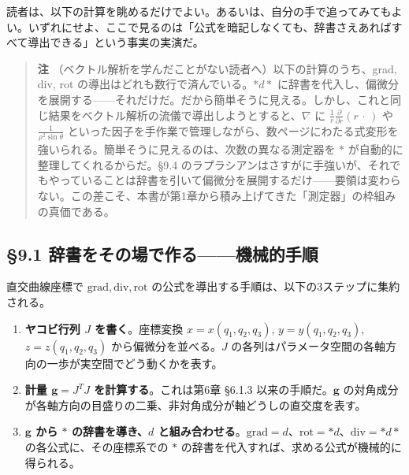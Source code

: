 \documentclass[a4paper,12pt,openany]{book}
\begin{document}
読者は、以下の計算を眺めるだけでよい。あるいは、自分の手で追ってみてもよい。いずれにせよ、ここで見るのは「公式を暗記しなくても、辞書さえあればすべて導出できる」という事実の実演だ。

\begin{quote}
\textbf{注}
（ベクトル解析を学んだことがない読者へ）以下の計算のうち、grad, div, rot
の導出はどれも数行で済んでいる。\(\ast d\ast\)
に辞書を代入し、偏微分を展開する——それだけだ。だから簡単そうに見える。しかし、これと同じ結果をベクトル解析の流儀で導出しようとすると、\(\nabla\)
に \(\frac{1}{r}\frac{\partial}{\partial r}(r\,\cdot\,)\) や
\(\frac{1}{\rho^2\sin\theta}\)
といった因子を手作業で管理しながら、数ページにわたる式変形を強いられる。簡単そうに見えるのは、次数の異なる測定器を
\(\ast\) が自動的に整理してくれるからだ。§9.4
のラプラシアンはさすがに手強いが、それでもやっていることは辞書を引いて偏微分を展開するだけ——要領は変わらない。この差こそ、本書が第1章から積み上げてきた「測定器」の枠組みの真価である。
\end{quote}

\par\vspace{0.35em}\par

\hypertarget{ux8f9eux66f8ux3092ux305dux306eux5834ux3067ux4f5cux308bux6a5fux68b0ux7684ux624bux9806}{%
\subsection{§9.1
辞書をその場で作る——機械的手順}\label{ux8f9eux66f8ux3092ux305dux306eux5834ux3067ux4f5cux308bux6a5fux68b0ux7684ux624bux9806}}

直交曲線座標で \(\mathrm{grad}, \mathrm{div}, \mathrm{rot}\)
の公式を導出する手順は、以下の3ステップに集約される。

\begin{enumerate}
\def\labelenumi{\arabic{enumi}.}
\item
  \textbf{ヤコビ行列 $J$ を書く}。座標変換 \(x = x(q_1,q_2,q_3)\),
  \(y = y(q_1,q_2,q_3)\), \(z = z(q_1,q_2,q_3)\)
  から偏微分を並べる。\(J\)
  の各列はパラメータ空間の各軸方向の一歩が実空間でどう動くかを表す。
\item
  \textbf{計量 $\mathbf{g} = J^T J$ を計算する}。これは第6章 §6.1.3
  以来の手順だ。\(\mathbf{g}\)
  の対角成分が各軸方向の目盛りの二乗、非対角成分が軸どうしの直交度を表す。
\item
  \textbf{$\mathbf{g}$ から $\ast$ の辞書を導き、$d$ と組み合わせる}。\(\mathrm{grad} = d\)、\(\mathrm{rot}=\ast d\)、\(\mathrm{div}=\ast d\ast\)
  の各公式に、その座標系での \(\ast\)
  の辞書を代入すれば、求める公式が機械的に得られる。
\end{enumerate}
\end{document}
